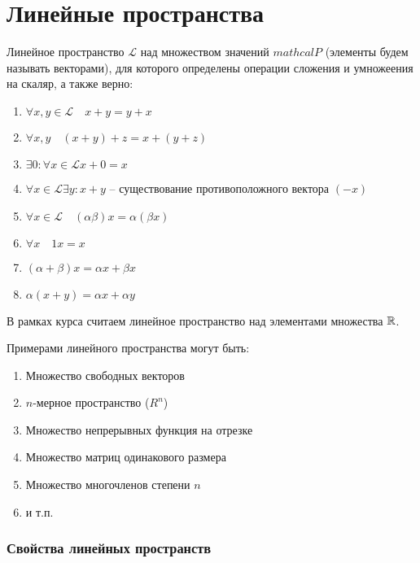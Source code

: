 \section{Линейные пространства}

\begin{definition}
  Линейное пространство $\mathcal{L}$ над множеством значений $mathcal{P}$ (элементы будем называть векторами), для которого определены операции сложения и умножеения на скаляр, а также верно:
    \begin{enumerate}
        \item $\forall x, y \in \mathcal{L} \quad x + y = y + x$
        \item $\forall x, y \quad (x + y) + z = x + (y + z)$
        \item $\exists 0 : \forall x \in \mathcal{L} x + 0 = x$
        \item $\forall x \in \mathcal{L} \exists y : x + y$ -- существование противоположного вектора $(-x)$
        \item $\forall x \in \mathcal{L} \quad (\alpha \beta) x = \alpha (\beta x)$
        \item $\forall x \quad 1 x = x$ 
        \item $(\alpha + \beta) x = \alpha x + \beta x$
        \item $\alpha(x + y) = \alpha x + \alpha y$ 
    \end{enumerate}
\end{definition}

В рамках курса считаем линейное пространство над элементами множества $\mathbb{R}$. 

Примерами линейного пространства могут быть:
\begin{enumerate}
    \item Множество свободных векторов
    \item $n$-мерное пространство ($R^n$) 
    \item Множество непрерывных функция на отрезке
    \item Множество матриц одинакового размера
    \item Множество многочленов степени $n$
    \item и т.п.
\end{enumerate}

\subsubsection{Свойства линейных пространств}

